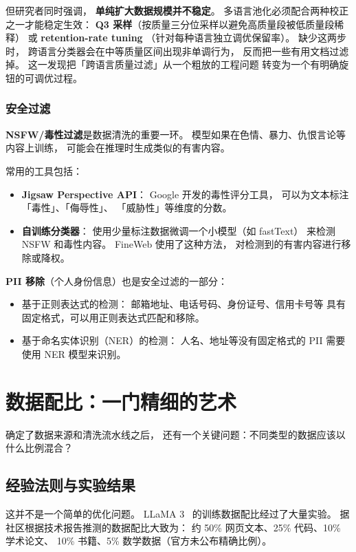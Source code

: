 但研究者同时强调，
\textbf{单纯扩大数据规模并不稳定}。
多语言池化必须配合两种校正之一才能稳定生效：
\textbf{Q3 采样}（按质量三分位采样以避免高质量段被低质量段稀释）
或 \textbf{retention-rate tuning}
（针对每种语言独立调优保留率）。
缺少这两步时，
跨语言分类器会在中等质量区间出现非单调行为，
反而把一些有用文档过滤掉。
这一发现把「跨语言质量过滤」从一个粗放的工程问题
转变为一个有明确旋钮的可调优过程。

\subsubsection{安全过滤}

\textbf{NSFW/毒性过滤}是数据清洗的重要一环。
模型如果在色情、暴力、仇恨言论等内容上训练，
可能会在推理时生成类似的有害内容。

常用的工具包括：
\begin{itemize}[noitemsep]
  \item \textbf{Jigsaw Perspective API}：
        Google 开发的毒性评分工具，
        可以为文本标注「毒性」、「侮辱性」、
        「威胁性」等维度的分数。
  \item \textbf{自训练分类器}：
        使用少量标注数据微调一个小模型（如 fastText）
        来检测 NSFW 和毒性内容。
        FineWeb 使用了这种方法，
        对检测到的有害内容进行移除或降权。
\end{itemize}

\textbf{PII 移除}（个人身份信息）也是安全过滤的一部分：
\begin{itemize}[noitemsep]
  \item 基于正则表达式的检测：
        邮箱地址、电话号码、身份证号、信用卡号等
        具有固定格式，可以用正则表达式匹配和移除。
  \item 基于命名实体识别（NER）的检测：
        人名、地址等没有固定格式的 PII
        需要使用 NER 模型来识别。
\end{itemize}

\section{数据配比：一门精细的艺术}

确定了数据来源和清洗流水线之后，
还有一个关键问题：不同类型的数据应该以什么比例混合？

\subsection{经验法则与实验结果}

这并不是一个简单的优化问题。
LLaMA 3~\cite{dubey2024llama3} 的训练数据配比经过了大量实验。
据社区根据技术报告推测的数据配比大致为：
约 50\% 网页文本、25\% 代码、10\% 学术论文、
10\% 书籍、5\% 数学数据（官方未公布精确比例）。

